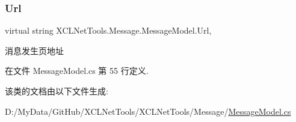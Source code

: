 \subsubsection{\texorpdfstring{Url}{Url}}
{\footnotesize\ttfamily virtual string X\+C\+L\+Net\+Tools.\+Message.\+Message\+Model.\+Url\hspace{0.3cm}{\ttfamily [get]}, {\ttfamily [set]}}



消息发生页地址 



在文件 Message\+Model.\+cs 第 55 行定义.



该类的文档由以下文件生成\+:\begin{DoxyCompactItemize}
\item 
D\+:/\+My\+Data/\+Git\+Hub/\+X\+C\+L\+Net\+Tools/\+X\+C\+L\+Net\+Tools/\+Message/\hyperlink{_message_model_8cs}{Message\+Model.\+cs}\end{DoxyCompactItemize}
